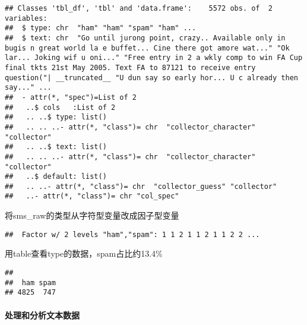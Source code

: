 \documentclass[]{article}
\newenvironment{Shaded}{\begin{snugshade}}{\end{snugshade}}
\newcommand{\KeywordTok}[1]{\textcolor[rgb]{0.13,0.29,0.53}{\textbf{#1}}}
\newcommand{\StringTok}[1]{\textcolor[rgb]{0.31,0.60,0.02}{#1}}
\newcommand{\OperatorTok}[1]{\textcolor[rgb]{0.81,0.36,0.00}{\textbf{#1}}}
\newcommand{\NormalTok}[1]{#1}
\let\oldparagraph\paragraph
\renewcommand{\paragraph}[1]{\oldparagraph{#1}\mbox{}}
\begin{document}
\begin{verbatim}
## Classes 'tbl_df', 'tbl' and 'data.frame':    5572 obs. of  2 variables:
##  $ type: chr  "ham" "ham" "spam" "ham" ...
##  $ text: chr  "Go until jurong point, crazy.. Available only in bugis n great world la e buffet... Cine there got amore wat..." "Ok lar... Joking wif u oni..." "Free entry in 2 a wkly comp to win FA Cup final tkts 21st May 2005. Text FA to 87121 to receive entry question("| __truncated__ "U dun say so early hor... U c already then say..." ...
##  - attr(*, "spec")=List of 2
##   ..$ cols   :List of 2
##   .. ..$ type: list()
##   .. .. ..- attr(*, "class")= chr  "collector_character" "collector"
##   .. ..$ text: list()
##   .. .. ..- attr(*, "class")= chr  "collector_character" "collector"
##   ..$ default: list()
##   .. ..- attr(*, "class")= chr  "collector_guess" "collector"
##   ..- attr(*, "class")= chr "col_spec"
\end{verbatim}

将sms\_raw的类型从字符型变量改成因子型变量

\begin{Shaded}
\end{Shaded}

\begin{verbatim}
##  Factor w/ 2 levels "ham","spam": 1 1 2 1 1 2 1 1 2 2 ...
\end{verbatim}

用table查看type的数据，spam占比约13.4\%

\begin{Shaded}
\end{Shaded}

\begin{verbatim}
## 
##  ham spam 
## 4825  747
\end{verbatim}

\paragraph{处理和分析文本数据}
\end{document}
